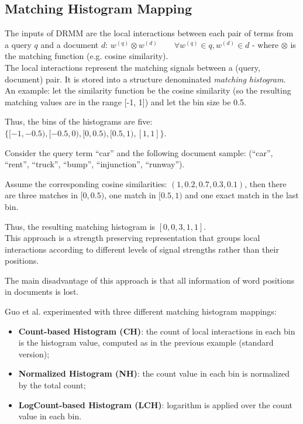 \subsection{Matching Histogram Mapping}
\label{ssec:mhist}

The inputs of DRMM are the local interactions between each pair of terms
from a query $q$ and a document $d$: $w^{(q)} \otimes w^{(d)} \qquad \forall w^{(q)} \in q, w^{(d)} \in d $ -
where $\otimes$ is the matching function (e.g. cosine similarity).\\

The local interactions represent the matching signals between a (query, document) pair. It is stored into a structure denominated \textit{matching histogram}.\\

An example: let the similarity function be the cosine similarity (so the resulting matching values are in the range [-1, 1]) and let the bin
size be 0.5.

Thus, the bins of the histograms are five: $\{[-1, -0.5), [-0.5, 0),
[0, 0.5), [0.5,1), [1,1]\}$.

Consider the query term ``car'' and the following document sample: (``car'', ``rent'',
``truck'', ``bump'', ``injunction'', ``runway'').

Assume the corresponding cosine similarities: $(1, 0.2, 0.7, 0.3, 0.1)$, then there are three matches in $[0, 0.5)$, one match in $[0.5, 1)$ and one exact match in the last bin.

Thus, the resulting matching histogram is $[0, 0, 3, 1, 1]$.\\

This approach is a strength preserving representation that groups local
interactions according to different levels of signal strengths rather than
their positions.

The main disadvantage of this approach is that all information of word positions in documents is lost.

Guo et al. experimented with three different matching histogram mappings:

\begin{itemize}
\item \textbf{Count-based Histogram (CH)}: the count of local interactions
in each bin is the histogram value, computed as in the previous example (standard version);
\item \textbf{Normalized Histogram (NH)}: the count value in each bin is
normalized by the total count;
\item \textbf{LogCount-based Histogram (LCH)}: logarithm is applied over the
count value in each bin.
\end{itemize}


